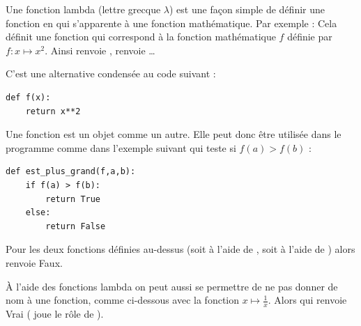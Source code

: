 \documentclass[11pt,class=report,crop=false]{standalone}
\begin{document}
\begin{cours}
	
	
Une fonction lambda (lettre grecque $\lambda$) est une façon simple de définir une fonction en \Python{} qui s'apparente à une fonction mathématique. Par
exemple :
Cela définit une fonction \Python{}  qui correspond à la fonction mathématique $f$ définie par $f : x \mapsto x^2$.
Ainsi  renvoie ,  renvoie \ldots

C'est une alternative condensée au code suivant :
\begin{center}
\begin{minipage}{0.6\textwidth}
\begin{lstlisting}
def f(x):
    return x**2
\end{lstlisting} 
\end{minipage}
\end{center}

\medskip

Une fonction est un objet \Python{} comme un autre. Elle peut donc être utilisée dans le programme comme dans l'exemple suivant qui teste si $f(a)>f(b)$ :

\begin{center}
\begin{minipage}{0.6\textwidth}
\begin{lstlisting}
def est_plus_grand(f,a,b):
    if f(a) > f(b):
        return True
    else:
        return False  
\end{lstlisting} 
\end{minipage}
\end{center}


Pour les deux fonctions  définies au-dessus (soit à l'aide de , soit à l'aide de ) alors
renvoie \og{}Faux\fg{}.

\`A l'aide des fonctions lambda on peut aussi se permettre de ne pas donner de nom à une fonction, comme ci-dessous avec la fonction $x \mapsto \frac1x$. Alors
qui renvoie \og{}Vrai\fg{} ( joue le rôle de ).
\end{cours}


\end{document}
